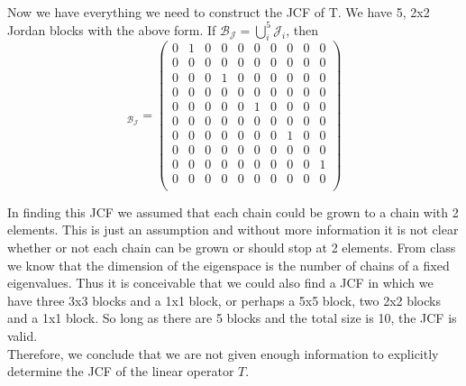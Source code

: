\documentclass[a4paper, 11pt]{article}
\newenvironment{solution}{%
	\begin{list}{}{%
			\setlength{\topsep}{0pt}%
			\setlength{\leftmargin}{1.5cm}%
			\setlength{\rightmargin}{1.5cm}%
			\setlength{\listparindent}{\parindent}%
			\setlength{\itemindent}{\parindent}%
			\setlength{\parsep}{\parskip}%
		}%
		\item[]}{\end{list}}
\begin{document}
\begin{solution}
\begin{align*}
  \end{align*}
  Now we have everything we need to construct the JCF of T. We have 5, 2x2 Jordan blocks with the above form. If $\mathcal{B}_\mathcal{J}=\bigcup\limits_i^5\mathcal{J}_i$, then
  \begin{equation*}
    [T]_{\mathcal{B}_\mathcal{J}}=\begin{pmatrix}
    0 & 1 & 0 & 0 & 0 & 0 & 0 & 0 & 0 & 0 \\
    0 & 0 & 0 & 0 & 0 & 0 & 0 & 0 & 0 & 0 \\
    0 & 0 & 0 & 1 & 0 & 0 & 0 & 0 & 0 & 0 \\
    0 & 0 & 0 & 0 & 0 & 0 & 0 & 0 & 0 & 0 \\
    0 & 0 & 0 & 0 & 0 & 1 & 0 & 0 & 0 & 0 \\
    0 & 0 & 0 & 0 & 0 & 0 & 0 & 0 & 0 & 0 \\
    0 & 0 & 0 & 0 & 0 & 0 & 0 & 1 & 0 & 0 \\
    0 & 0 & 0 & 0 & 0 & 0 & 0 & 0 & 0 & 0 \\
    0 & 0 & 0 & 0 & 0 & 0 & 0 & 0 & 0 & 1 \\
    0 & 0 & 0 & 0 & 0 & 0 & 0 & 0 & 0 & 0 \\
    \end{pmatrix}
  \end{equation*}

  \noindent In finding this JCF we assumed that each chain could be grown to a chain with 2 elements. This is just an assumption and without more information it is not clear whether or not each chain can be grown or should stop at 2 elements. From class we know that the dimension of the eigenspace is the number of chains of a fixed eigenvalues. Thus it is conceivable that we could also find a JCF in which we have three 3x3 blocks and a 1x1 block, or perhaps a 5x5 block, two 2x2 blocks and a 1x1 block. So long as there are 5 blocks and the total size is 10, the JCF is valid. \\

  \noindent Therefore, we conclude that we are not given enough information to explicitly determine the JCF of the linear operator $T$. 

\end{solution}
\end{document}
